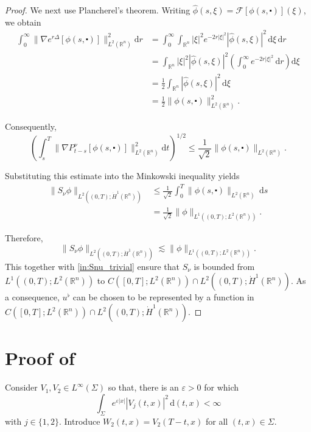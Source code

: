 \documentclass[10pt,a4paper]{amsart}
\newcommand{\R}{\mathbb{R}}
\newcommand{\dd}{\mathrm{d}}
\begin{document}
\begin{proof}
We next use Plancherel's theorem. Writing 
$\widehat \phi(s, \xi) = \mathcal{F}[\phi(s, \centerdot)](\xi)$, we obtain
\begin{align*}
    \int_0^\infty
    \|\nabla e^{r\Delta}[\phi(s, \centerdot)]\|_{L^2(\mathbb R^n)}^2
    \dd r
    &=
    \int_0^\infty
    \int_{\mathbb R^n}
    |\xi|^2 e^{-2r|\xi|^2}
    |\widehat \phi(s, \xi)|^2
    \,\dd \xi\,\dd r
    \\
    &=
    \int_{\mathbb R^n}
    |\xi|^2 |\widehat \phi(s,\xi)|^2
    \left(
        \int_0^\infty e^{-2r|\xi|^2}\,\dd r
    \right)
    \dd \xi
    \\
    &=
    \frac12
    \int_{\mathbb R^n}
    |\widehat \phi(s,\xi)|^2\,\dd \xi
    \\
    &=
    \frac12
    \|\phi(s, \centerdot)\|_{L^2(\mathbb R^n)}^2.
\end{align*}

Consequently,
\[
    \left(
        \int_s^T
        \|\nabla P_{t-s}^\nu[\phi(s, \centerdot)]\|_{L^2(\mathbb R^n)}^2
        \dd t
    \right)^{1/2}
    \le
    \frac{1}{\sqrt{2}}
    \|\phi(s, \centerdot)\|_{L^2(\mathbb R^n)}.
\]

Substituting this estimate into the Minkowski inequality yields
\begin{align*}
    \|S_\nu\phi\|_{L^2((0,T);\dot H^1(\mathbb R^n))}
    &\le
    \frac{1}{\sqrt{2}}
    \int_0^T
    \|\phi(s, \centerdot)\|_{L^2(\mathbb R^n)}
    \,\dd s
    \\
    &=
    \frac{1}{\sqrt{2}}
    \|\phi\|_{L^1((0,T);L^2(\mathbb R^n))}.
\end{align*}

Therefore,
\[\|S_\nu \phi \|_{L^2((0, T); \dot H^1(\R^n))} \lesssim \| \phi\|_{L^1((0,T); L^2(\R^n))}.\]
This together with \eqref{in:Snu_trivial} ensure that $S_\nu$ is 
bounded from $L^1((0, T); L^2(\R^n))$ to 
$C([0, T]; L^2(\R^n))\cap L^2((0,T); \dot H^1(\R^n))$.
As a consequence, $u^\flat$ can be chosen to be represented
by a function in $C([0, T]; L^2(\R^n))\cap L^2((0,T); \dot H^1(\R^n))$.
\end{proof}

\section{Proof of \texorpdfstring{}{th:uniqueness}}
\label{sec:proof_main-th}
Consider $V_1, V_2 \in L^\infty (\Sigma) $ so that,
there is an $\varepsilon > 0$ for which
\[\int_\Sigma e^{ \varepsilon |x|} |V_j(t, x) |^2 \, \dd (t, x) < \infty\]
with $j \in \{ 1, 2 \}$. Introduce $W_2 (t, x) = V_2 (T-t, x)$ for all
$(t, x) \in \Sigma$.
\end{document}
